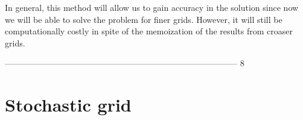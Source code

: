 \documentclass[11pt,a4paper]{article}
\begin{document}
In general, this method will allow us to gain accuracy in the solution since now we will be able to solve the problem for finer grids. However, it will still be computationally costly in spite of the memoization of the results from croaser grids.

-----------------------------------------------------------------------------------
8
\section{Stochastic grid}
\end{document}

